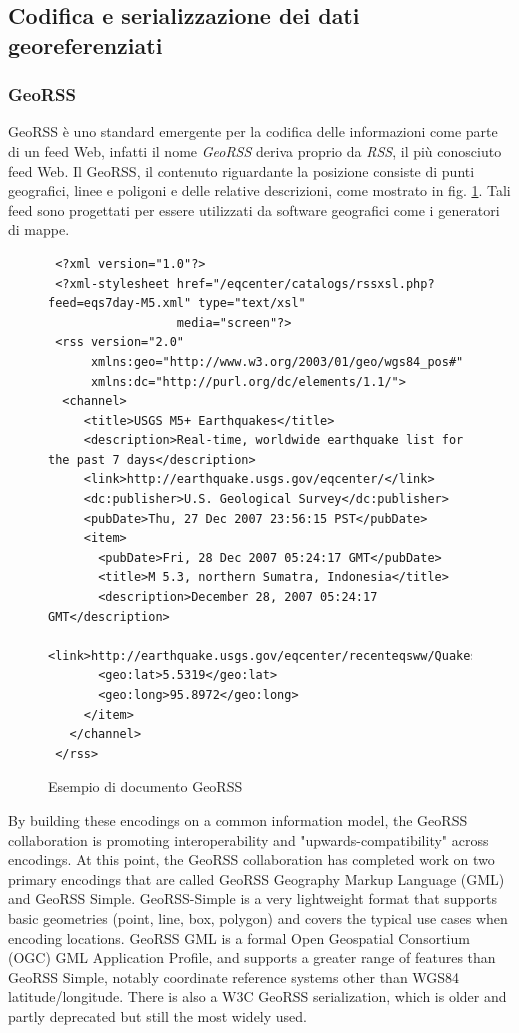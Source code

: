 \subsection{Codifica e serializzazione dei dati georeferenziati}
\subsubsection{GeoRSS}
GeoRSS è uno standard emergente per la codifica delle informazioni come parte di un feed Web, infatti il nome \emph{GeoRSS} deriva proprio da \emph{RSS}, il più conosciuto feed Web.
Il GeoRSS, il contenuto riguardante la posizione consiste di punti geografici, linee e poligoni e delle relative descrizioni, come mostrato in fig. \ref{georssimage}. Tali feed sono progettati per essere utilizzati da software geografici come i generatori di mappe.

\begin{figure}
\begin{center}
\lstset{language=MYXML}
\begin{lstlisting}
 <?xml version="1.0"?>
 <?xml-stylesheet href="/eqcenter/catalogs/rssxsl.php?feed=eqs7day-M5.xml" type="text/xsl" 
                  media="screen"?>
 <rss version="2.0" 
      xmlns:geo="http://www.w3.org/2003/01/geo/wgs84_pos#" 
      xmlns:dc="http://purl.org/dc/elements/1.1/">
  <channel>
     <title>USGS M5+ Earthquakes</title>
     <description>Real-time, worldwide earthquake list for the past 7 days</description>
     <link>http://earthquake.usgs.gov/eqcenter/</link>
     <dc:publisher>U.S. Geological Survey</dc:publisher>
     <pubDate>Thu, 27 Dec 2007 23:56:15 PST</pubDate>
     <item>
       <pubDate>Fri, 28 Dec 2007 05:24:17 GMT</pubDate>
       <title>M 5.3, northern Sumatra, Indonesia</title>
       <description>December 28, 2007 05:24:17 GMT</description>
       <link>http://earthquake.usgs.gov/eqcenter/recenteqsww/Quakes/us2007llai.php</link>
       <geo:lat>5.5319</geo:lat>
       <geo:long>95.8972</geo:long>
     </item>
   </channel>
 </rss>
\end{lstlisting}
\caption{Esempio di documento GeoRSS\label{georssimage}}
\end{center}
\end{figure}

By building these encodings on a common information model, the GeoRSS collaboration is promoting interoperability and "upwards-compatibility" across encodings.
At this point, the GeoRSS collaboration has completed work on two primary encodings that are called GeoRSS Geography Markup Language (GML) and GeoRSS Simple. GeoRSS-Simple is a very lightweight format that supports basic geometries (point, line, box, polygon) and covers the typical use cases when encoding locations. GeoRSS GML is a formal Open Geospatial Consortium (OGC) GML Application Profile, and supports a greater range of features than GeoRSS Simple, notably coordinate reference systems other than WGS84 latitude/longitude. There is also a W3C GeoRSS serialization, which is older and partly deprecated but still the most widely used.


